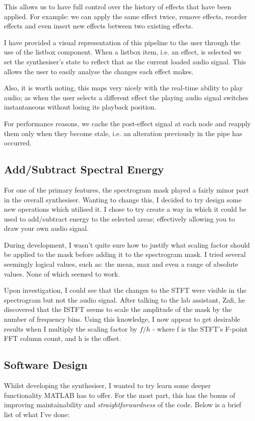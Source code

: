 \documentclass{coursework}
\begin{document}
			This allows us to have full control over the history of effects that have been applied. For example: we can apply the same effect twice, remove effects, reorder effects and even insert new effects between two existing effects.
			
			I have provided a visual representation of this pipeline to the user through the use of the listbox component. When a listbox item, i.e. an effect, is selected we set the synthesiser's state to reflect that as the current loaded audio signal. This allows the user to easily analyse the changes each effect makes.
			
			Also, it is worth noting, this maps very nicely with the real-time ability to play audio; as when the user selects a different effect the playing audio signal switches instantaneous without losing its playback position. 
			
			For performance reasons, we cache the post-effect signal at each node and reapply them only when they become stale, i.e. an alteration previously in the pipe has occurred.
			
		\subsection{Add/Subtract Spectral Energy} \label{ss:spectralenergy}
			For one of the primary features, the spectrogram mask played a fairly minor part in the overall synthesiser. Wanting to change this, I decided to try design some new operations which utilised it. I chose to try create a way in which it could be used to add/subtract energy to the selected areas; effectively allowing you to draw your own audio signal.
			
			During development, I wasn't quite sure how to justify what scaling factor should be applied to the mask before adding it to the spectrogram mask. I tried several seemingly logical values, such as: the mean, max and even a range of absolute values. None of which seemed to work.
			
			Upon investigation, I could see that the changes to the STFT were visible in the spectrogram but not the audio signal. After talking to the lab assistant, Zafi, he discovered that the ISTFT seems to scale the amplitude of the mask by the number of frequency bins.\parencite{helpZafi} Using this knowledge, I now appear to get desirable results when I multiply the scaling factor by $f/h$ - where f is the STFT's F-point FFT column count, and h is the offset.
			
		\subsection{Software Design}
			Whilst developing the synthesiser, I wanted to try learn some deeper functionality MATLAB has to offer. For the most part, this has the bonus of improving maintainability and \textit{straightforwardness} of the code. Below is a brief list of what I've done:
			
\end{document}
